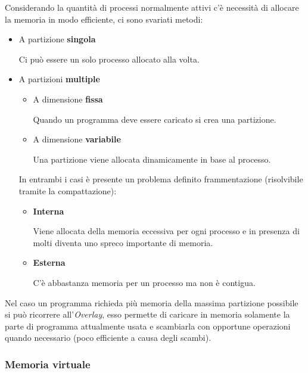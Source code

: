 \documentclass{article}
\begin{document}
\noindent Considerando la quantità di processi normalmente attivi c'è necessità di allocare la memoria in modo efficiente, ci sono svariati metodi:
\begin{itemize}
    \item A partizione \textbf{singola}
    
        Ci può essere un solo processo allocato alla volta.

    \item A partizioni \textbf{multiple}
        \begin{itemize}
            \item A dimensione \textbf{fissa}

                Quando un programma deve essere caricato si crea una partizione.

            \item A dimensione \textbf{variabile}

                Una partizione viene allocata dinamicamente in base al processo.
            
        \end{itemize}

        In entrambi i casi è presente un problema definito frammentazione (risolvibile tramite la compattazione):
        \begin{itemize}
            \item \textbf{Interna}

                Viene allocata della memoria eccessiva per ogni processo e in presenza di molti diventa uno spreco importante di memoria.
    
            \item \textbf{Esterna}

                C'è abbastanza memoria per un processo ma non è contigua.\newline
            
        \end{itemize}
        
\end{itemize}

\noindent Nel caso un programma richieda più memoria della massima partizione possibile si può ricorrere all'\textit{Overlay}, esso permette di caricare in memoria solamente la parte di programma attualmente usata e scambiarla con opportune operazioni quando necessario (poco efficiente a causa degli scambi).\newline

\subsubsection{Memoria virtuale}
\end{document}
